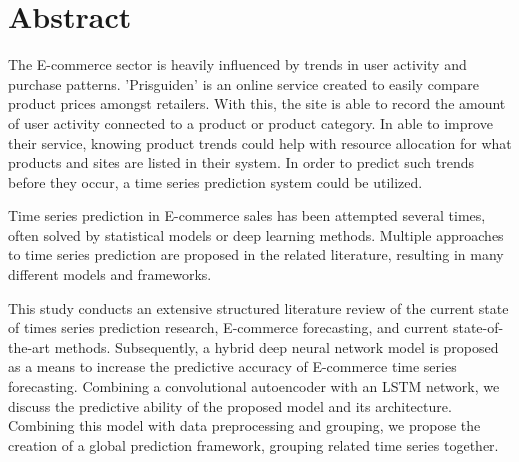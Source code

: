 \section*{Abstract}
\label{section:Abstract}

The E-commerce sector is heavily influenced by trends in user activity and purchase patterns.
'Prisguiden' is an online service created to easily compare product prices amongst retailers.
With this, the site is able to record the amount of user activity connected to a product or product category.
In able to improve their service, knowing product trends could help with resource allocation for what products and sites are listed in their system.
In order to predict such trends before they occur, a time series prediction system could be utilized.

Time series prediction in E-commerce sales has been attempted several times,
often solved by statistical models or deep learning methods.
Multiple approaches to time series prediction are proposed in the related literature,
resulting in many different models and frameworks.

This study conducts an extensive structured literature review of the current state of times series prediction research, E-commerce forecasting,
and current state-of-the-art methods.
Subsequently, a hybrid deep neural network model is proposed as a means to increase the predictive accuracy of E-commerce time series forecasting.
Combining a convolutional autoencoder with an LSTM network, we discuss the predictive ability of the proposed model
and its architecture.
Combining this model with data preprocessing and grouping, we propose the creation of a global prediction framework,
grouping related time series together.




\iffalse
    This paper provides a template for writing AI project rapports for either the AI specialization project; masters "datateknikk" or masters "informatikk". The use of the template is recommended and is written in english as we encourage students to submit their project and masters theses in English.
    The template does not form a compulsory style that you are obliged to use. However, the format and contents are a result of a joint AI group initiative thus providing a common starting point for all AI students. For a given project tuning of the template may still be required. Such tuning might involve moving a chapter to a section or vice versa due to the nature of the project.

    The abstract is your sales pitch which encourages people to read your work but unlike sales it should be realistic with respect to the contributions of the work. It should include:
    \begin{itemize}
        \item the field of research
        \item a brief motivation for the work
        \item what the research topic is and
        \item the research approach(es) applied.
        \item contributions
    \end{itemize}

    The abstract length should be roughly half a page of text --- without lists, tables or figures.
\fi
